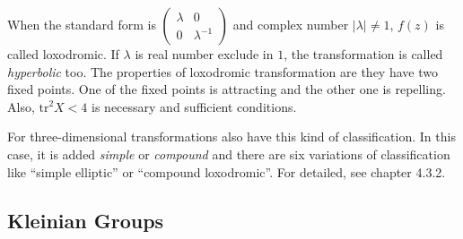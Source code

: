 When the standard form is
$\begin{pmatrix}\lambda & 0 \\ 0 & \lambda^{-1} \end{pmatrix}$
and complex number $|\lambda| \neq 1$, $f(z)$ is called loxodromic.
If $\lambda$ is real number exclude in $1$, the transformation is called
\textit{hyperbolic} too.
The properties of loxodromic transformation are they have two fixed
points. One of the fixed points is attracting and the other one is repelling.
Also, $\mathrm{tr}^2X < 4$ is necessary and sufficient conditions.

For three-dimensional transformations also have this kind of
classification.
In this case, it is added \textit{simple} or \textit{compound} and
there are six variations of classification like ``simple elliptic'' or
``compound loxodromic''.
For detailed, see chapter 4.3.2.



\subsection{Kleinian Groups}

